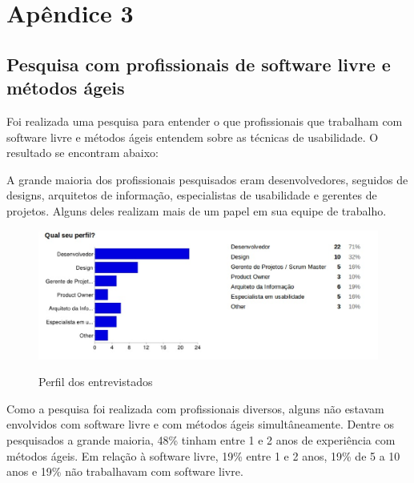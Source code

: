 \newpage

\chapter{Apêndice 3}
\label{apendice3}

\section{Pesquisa com profissionais de software livre e métodos ágeis}

	Foi realizada uma pesquisa para entender o que profissionais que trabalham com software livre e métodos ágeis entendem sobre as técnicas de usabilidade. O resultado se encontram abaixo:
	
	A grande maioria dos profissionais pesquisados eram desenvolvedores, seguidos de designs, arquitetos de informação, especialistas de usabilidade e gerentes de projetos. Alguns deles realizam mais de um papel em sua equipe de trabalho.
	
	\begin{figure}[!h]
    	\centering
    	\includegraphics[keepaspectratio=true,scale=0.55]
      		{figuras/perfil.eps}
    	\label{concepcao}
		\caption{Perfil dos entrevistados}
	\end{figure}
	
	Como a pesquisa foi realizada com profissionais diversos, alguns não estavam envolvidos com software livre e com métodos ágeis simultâneamente. Dentre os pesquisados a grande maioria, 48\% tinham entre 1 e 2 anos de experiência com métodos ágeis. Em relação à software livre, 19\% entre 1 e 2 anos, 19\% de 5 a 10 anos e 19\% não trabalhavam com software livre.
	
